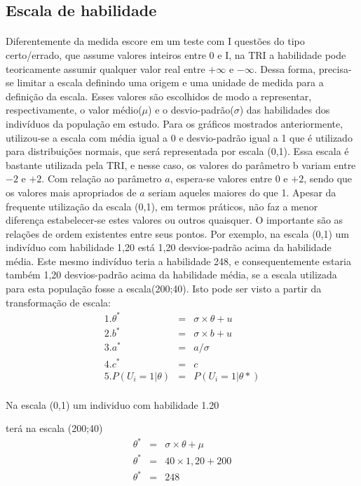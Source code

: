 	\subsection{Escala de habilidade}
	\paragraph{}
	    Diferentemente da medida escore em um teste com I questões do tipo
	    certo/errado, que assume valores inteiros entre 0 e I, na TRI a habilidade pode
	    teoricamente assumir qualquer valor real entre $+\displaystyle\infty$ e $-\displaystyle\infty$. Dessa forma, precisa-se limitar a escala definindo uma origem e uma unidade de medida para a definição da escala. Esses valores são escolhidos de modo a representar, respectivamente, o valor médio($\mu$) e o desvio-padrão($\sigma$) das habilidades dos indivíduos da população em estudo. Para os gráficos mostrados anteriormente, utilizou-se a escala com média igual a 0 e desvio-padrão igual a 1 que é utilizado para distribuições normais, que será representada por escala (0,1). Essa escala é bastante utilizada pela TRI, e nesse caso, os valores do parâmetro b variam entre $-2$ e $+2$. Com relação ao parâmetro $a$, espera-se valores entre $0$ e $+2$, sendo que os valores mais apropriados de $a$ seriam aqueles maiores do que 1. Apesar da frequente utilização da escala (0,1), em termos práticos, não faz a menor diferença estabelecer-se estes valores ou outros quaisquer. O importante são as relações de ordem existentes entre seus pontos. Por exemplo, na escala (0,1) um indivíduo com habilidade 1,20 está 1,20 desvios-padrão acima da habilidade média. Este mesmo indivíduo teria a habilidade 248, e consequentemente estaria também 1,20 desvios-padrão acima da habilidade média, se a escala utilizada para esta população fosse a escala(200;40). Isto pode ser visto a partir da transformação de escala:
	\begin{eqnarray}
		1.\theta^* & = & \sigma \times \theta + u\\
		2 .b^* & = & \sigma \times b + u\\
		3. a^* & = & a/\sigma\\
		4. c^* & = & c\\
		5. P(U_i = 1|\theta) & = & P(U_i = 1|\theta*)\\
	\end{eqnarray}
	
	Na escala (0,1) um individuo com habilidade 1.20
	
	terá na escala (200;40)
	\begin{eqnarray}
    	 \theta^* & = & \sigma \times \theta + \mu \nonumber\\
    	 \theta^* & = & 40 \times 1,20 + 200 \nonumber\\
    	 \theta^* & = & 248 \nonumber\\
	 \end{eqnarray}
